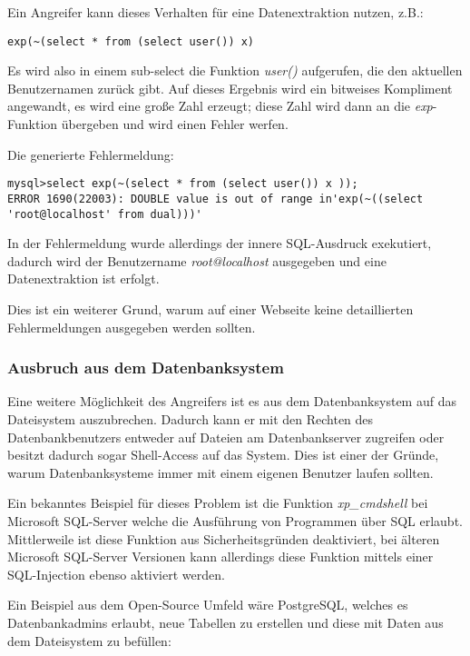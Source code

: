 Ein Angreifer kann dieses Verhalten für eine Datenextraktion nutzen, z.B.:

\begin{verbatim}
exp(~(select * from (select user()) x)
\end{verbatim}

Es wird also in einem sub-select die Funktion \textit{user()} aufgerufen, die den aktuellen Benutzernamen zurück gibt. Auf dieses Ergebnis wird ein bitweises Kompliment angewandt, es wird eine große Zahl erzeugt; diese Zahl wird dann an die \textit{exp}-Funktion übergeben und wird einen Fehler werfen.

Die generierte Fehlermeldung:

\begin{verbatim}
mysql>select exp(~(select * from (select user()) x ));
ERROR 1690(22003): DOUBLE value is out of range in'exp(~((select 'root@localhost' from dual)))'
\end{verbatim}

In der Fehlermeldung wurde allerdings der innere SQL-Ausdruck exekutiert, dadurch wird der Benutzername \textit{root@localhost} ausgegeben und eine Datenextraktion ist erfolgt.

Dies ist ein weiterer Grund, warum auf einer Webseite keine detaillierten Fehlermeldungen ausgegeben werden sollten.

\subsubsection{Ausbruch aus dem Datenbanksystem}

Eine weitere Möglichkeit des Angreifers ist es aus dem Datenbanksystem auf das Dateisystem auszubrechen. Dadurch kann er mit den Rechten des Datenbankbenutzers entweder auf Dateien am Datenbankserver zugreifen oder besitzt dadurch sogar Shell-Access auf das System. Dies ist einer der Gründe, warum Datenbanksysteme immer mit einem eigenen Benutzer laufen sollten.

Ein bekanntes Beispiel für dieses Problem ist die Funktion \textit{xp\_cmdshell} bei Microsoft SQL-Server welche die Ausführung von Programmen über SQL erlaubt. Mittlerweile ist diese Funktion aus Sicherheitsgründen deaktiviert, bei älteren Microsoft SQL-Server Versionen kann allerdings diese Funktion mittels einer SQL-Injection ebenso aktiviert werden.

Ein Beispiel aus dem Open-Source Umfeld wäre PostgreSQL, welches es Datenbankadmins erlaubt, neue Tabellen zu erstellen und diese mit Daten aus dem Dateisystem zu befüllen:

